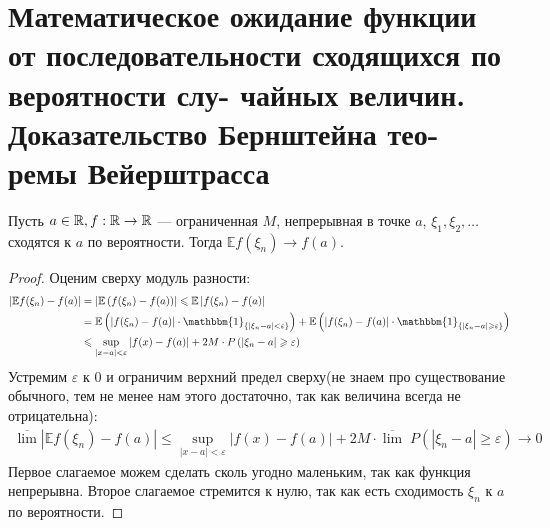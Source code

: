 \section{Математическое ожидание функции от последовательности сходящихся по вероятности слу- чайных величин. Доказательство Бернштейна тео- ремы Вейерштрасса}

\begin{theorem}
    Пусть $a \in \mathbb{R}, f : \mathbb{R} \to \mathbb{R}$ --- ограниченная $M$, непрерывная в точке $a$, $\xi_1, \xi_2, \dotsc$ сходятся к $a$ по вероятности. Тогда $\mathbb{E} f(\xi_n) \to f(a)$.
 \end{theorem}
 \begin{proof}
     Оценим сверху модуль разности:
     \begin{align*}
         \left | \mathbb{E} f(\xi_n) - f(a) \right | 
         &= \left | \mathbb{E} \left( f(\xi_n) - f(a) \right ) \right | \leq
         \mathbb{E} \left | f(\xi_n) - f(a) \right |  \\
         &= \mathbb{E} \left ( | f(\xi_n) - f(a) | \cdot \mathbbm{1}_{\{|\xi_n - a | < \varepsilon\}} \right )
         + \mathbb{E} \left ( | f(\xi_n) - f(a) | \cdot \mathbbm{1}_{\{|\xi_n - a| \geq \varepsilon\}} \right ) \\
         &\leq \sup\limits_{|x - a| < \varepsilon} | f(x) - f(a) | + 2M \cdot P \left ( |  \xi_n - a | \geq \varepsilon \right)
     \end{align*}
     Устремим $\varepsilon$ к 0 и ограничим верхний предел сверху(не знаем про существование обычного, тем не менее нам этого достаточно, так как величина всегда не отрицательна):
     \begin{align*}
         \overline{\lim} \left | \mathbb{E} f(\xi_n) - f(a) \right | \leq 
         \sup\limits_{|x - a| < \varepsilon} | f(x) - f(a)| +
         2M \cdot \overline{\lim} \; P(|\xi_n - a| \geq \varepsilon) \to 0
     \end{align*}
     Первое слагаемое можем сделать сколь угодно маленьким, так как функция непрерывна. Второе слагаемое стремится к нулю, так как есть сходимость $\xi_n$ к $a$ по вероятности.
 \end{proof}
 
